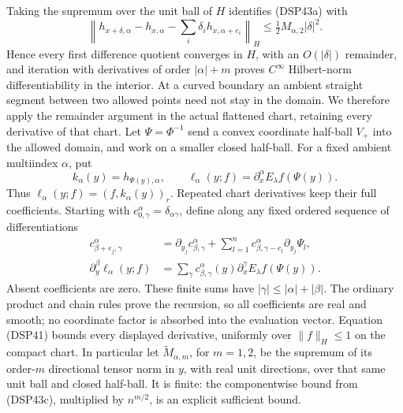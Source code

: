 \documentclass[
  11pt,
]{article}
\begin{document}
Taking the supremum over the unit ball of \(H\) identifies (DSP43a) with
\[
 \left\|h_{x+\delta,\alpha}-h_{x,\alpha}
 -\sum_i\delta_i h_{x,\alpha+e_i}\right\|_H
 \le \tfrac12 M_{\alpha,2}|\delta|^2 .
\] Hence every first difference quotient converges in \(H\), with an
\(O(|\delta|)\) remainder, and iteration with derivatives of order
\(|\alpha|+m\) proves \(C^\infty\) Hilbert-norm differentiability in the
interior. At a curved boundary an ambient straight segment between two
allowed points need not stay in the domain. We therefore apply the
remainder argument in the actual flattened chart, retaining every
derivative of that chart. Let \(\Psi=\Phi^{-1}\) send a convex
coordinate half-ball \(V_+\) into the allowed domain, and work on a
smaller closed half-ball. For a fixed ambient multiindex \(\alpha\), put
\[
 k_\alpha(y)=h_{\Psi(y),\alpha},\qquad
 \ell_\alpha(y;f)=\partial_x^\alpha E_\lambda f(\Psi(y)).
 \tag{DSP43b}
\] Thus \(\ell_\alpha(y;f)=(f,k_\alpha(y))_r\). Repeated chart
derivatives keep their full coefficients. Starting with
\(c^{\alpha}_{0,\gamma}=\delta_{\alpha\gamma}\), define along any fixed
ordered sequence of differentiations \[
 \begin{split}
 c^\alpha_{\beta+e_j,\gamma}
 &=\partial_{y_j}c^\alpha_{\beta,\gamma}
   +\sum_{l=1}^n c^\alpha_{\beta,\gamma-e_l}
                      \partial_{y_j}\Psi_l,\\
 \partial_y^\beta\ell_\alpha(y;f)
 &=\sum_\gamma c^\alpha_{\beta,\gamma}(y)
       \partial_x^\gamma E_\lambda f(\Psi(y)).
 \end{split}
 \tag{DSP43c}
\] Absent coefficients are zero. These finite sums have
\(|\gamma|\leq|\alpha|+|\beta|\). The ordinary product and chain rules
prove the recursion, so all coefficients are real and smooth; no
coordinate factor is absorbed into the evaluation vector. Equation
(DSP41) bounds every displayed derivative, uniformly over
\(\|f\|_H\leq1\) on the compact chart. In particular let
\(\widetilde M_{\alpha,m}\), for \(m=1,2\), be the supremum of its
order-\(m\) directional tensor norm in \(y\), with real unit directions,
over that same unit ball and closed half-ball. It is finite: the
componentwise bound from (DSP43c), multiplied by \(n^{m/2}\), is an
explicit sufficient bound.
\end{document}
